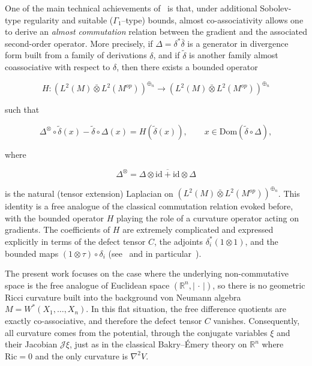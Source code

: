 \documentclass[10pt,a4paper,reqno]{amsart}
\newcommand{\Dom}{\mathrm{Dom}}
\begin{document}
\smallskip

One of the main technical achievements of~\cite{Dab14v2} is that, under
additional Sobolev-type regularity and suitable ($\Gamma_1$--type) bounds,
almost co-associativity allows one to derive an \emph{almost commutation}
relation between the gradient and the associated second-order operator.  More
precisely, if $\Delta=\delta^\ast\bar\delta$ is a generator in divergence form
built from a family of derivations $\delta$, and if $\tilde\delta$ is another
family almost coassociative with respect to $\delta$, then there exists a
bounded operator


\[
H : (L^2(M)\bar\otimes L^2(M^{op}))^{\oplus_n} \longrightarrow
    (L^2(M)\bar\otimes L^2(M^{op}))^{\oplus_n}
\]


such that


\[
\Delta^{\otimes}\circ\tilde\delta(x)
-
\tilde\delta\circ\Delta(x)
=
H(\tilde\delta(x)),
\qquad x\in \Dom(\tilde\delta\circ\Delta),
\]


where


\[
\Delta^{\otimes}
  = \overline{\Delta\otimes\mathrm{id}+\mathrm{id}\otimes\Delta}
\]


is the natural (tensor extension) Laplacian on
$(L^2(M)\bar\otimes L^2(M^{op}))^{\oplus_n}$.  This identity is a free analogue
of the classical commutation relation evoked before, with the bounded operator
$H$ playing the role of a curvature operator acting on gradients.  The
coefficients of $H$ are extremely complicated and expressed explicitly in terms
of the defect tensor $C$, the adjoints $\delta_i^\ast(1\otimes 1)$, and the
bounded maps $(1\otimes\tau)\circ\delta_i$
(see~\cite[Section~2.1.5]{Dab14v2} and in particular~\cite[Corollary~32]{Dab14v2}).

\smallskip

The present work focuses on the case where the underlying non-commutative space
is the free analogue of Euclidean space $(\mathbb{R}^n,\lvert\,\cdot\,\rvert)$,
so there is no geometric Ricci curvature built into the background von Neumann
algebra $M=W^\ast(X_1,\ldots,X_n)$.  In this flat situation, the free
difference quotients are exactly co-associative, and therefore the defect
tensor $C$ vanishes.  Consequently, all curvature comes from the potential,
through the conjugate variables $\xi$ and their Jacobian $\mathscr{J}\xi$, just
as in the classical Bakry--Émery theory on $\mathbb{R}^n$ where $\mathrm{Ric}=0$
and the only curvature is $\nabla^2V$.

\smallskip
\end{document}
